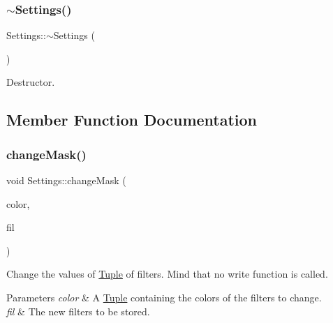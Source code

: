 \subsubsection{\texorpdfstring{$\sim$Settings()}{~Settings()}}
{\footnotesize\ttfamily Settings\+::$\sim$\+Settings (\begin{DoxyParamCaption}{ }\end{DoxyParamCaption})}



Destructor. 



\subsection{Member Function Documentation}
\mbox{\label{class_settings_ad0d55c536a84990b048463b924c7d88e}} 
\subsubsection{\texorpdfstring{changeMask()}{changeMask()}\hspace{0.1cm}{\footnotesize\ttfamily [1/2]}}
{\footnotesize\ttfamily void Settings\+::change\+Mask (\begin{DoxyParamCaption}\item[{\mbox{\hyperlink{class_tuple}{Tuple}}$<$ \mbox{\hyperlink{class_settings_a30d85f2e06a54ae9bc8da2d01037658f}{C\+O\+L\+OR}} $>$}]{color,  }\item[{\mbox{\hyperlink{class_tuple}{Tuple}}$<$ \mbox{\hyperlink{class_filter}{Filter}} $>$}]{fil }\end{DoxyParamCaption})}



Change the values of \mbox{\hyperlink{class_tuple}{Tuple}} of filters. Mind that no write function is called. 


\begin{DoxyParams}{Parameters}
{\em color} & A \mbox{\hyperlink{class_tuple}{Tuple}} containing the colors of the filters to change. \\
\hline
{\em fil} & The new filters to be stored. \\
\hline
\end{DoxyParams}
\mbox{\label{class_settings_ad00eb6c82b7e6af5afbb8d881c50dea8}} 
